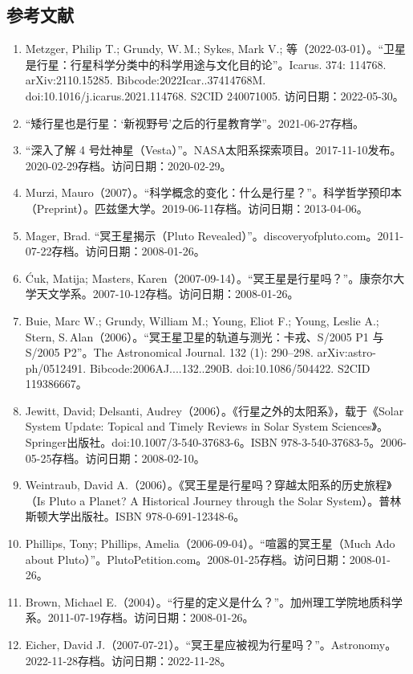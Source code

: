 \subsection{参考文献}
\begin{enumerate}
\item Metzger, Philip T.; Grundy, W.\,M.; Sykes, Mark V.; 等（2022-03-01）。“卫星是行星：行星科学分类中的科学用途与文化目的论”。Icarus. 374: 114768. arXiv:2110.15285. Bibcode:2022Icar..37414768M. doi:10.1016/j.icarus.2021.114768. S2CID 240071005. 访问日期：2022-05-30。
\item “矮行星也是行星：‘新视野号’之后的行星教育学”。2021-06-27存档。
\item “深入了解 4 号灶神星（Vesta）”。NASA太阳系探索项目。2017-11-10发布。2020-02-29存档。访问日期：2020-02-29。
\item Murzi, Mauro（2007）。“科学概念的变化：什么是行星？”。科学哲学预印本（Preprint）。匹兹堡大学。2019-06-11存档。访问日期：2013-04-06。
\item Mager, Brad. “冥王星揭示（Pluto Revealed）”。discoveryofpluto.com。2011-07-22存档。访问日期：2008-01-26。
\item Ćuk, Matija; Masters, Karen（2007-09-14）。“冥王星是行星吗？”。康奈尔大学天文学系。2007-10-12存档。访问日期：2008-01-26。
\item Buie, Marc W.; Grundy, William M.; Young, Eliot F.; Young, Leslie A.; Stern, S.\,Alan（2006）。“冥王星卫星的轨道与测光：卡戎、S/2005 P1 与 S/2005 P2”。The Astronomical Journal. 132 (1): 290–298. arXiv:astro-ph/0512491. Bibcode:2006AJ....132..290B. doi:10.1086/504422. S2CID 119386667。
\item Jewitt, David; Delsanti, Audrey（2006）。《行星之外的太阳系》，载于《Solar System Update: Topical and Timely Reviews in Solar System Sciences》。Springer出版社。doi:10.1007/3-540-37683-6。ISBN 978-3-540-37683-5。2006-05-25存档。访问日期：2008-02-10。
\item Weintraub, David A.（2006）。《冥王星是行星吗？穿越太阳系的历史旅程》（Is Pluto a Planet? A Historical Journey through the Solar System）。普林斯顿大学出版社。ISBN 978-0-691-12348-6。
\item Phillips, Tony; Phillips, Amelia（2006-09-04）。“喧嚣的冥王星（Much Ado about Pluto）”。PlutoPetition.com。2008-01-25存档。访问日期：2008-01-26。
\item Brown, Michael E.（2004）。“行星的定义是什么？”。加州理工学院地质科学系。2011-07-19存档。访问日期：2008-01-26。
\item Eicher, David J.（2007-07-21）。“冥王星应被视为行星吗？”。Astronomy。2022-11-28存档。访问日期：2022-11-28。

\end{enumerate}
